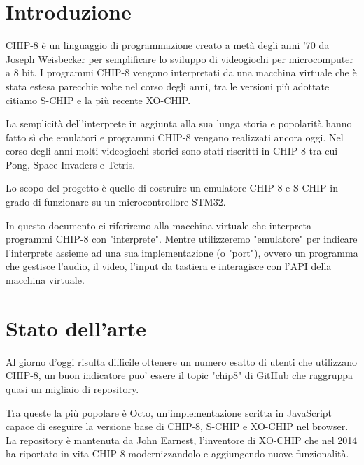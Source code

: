 \documentclass[a4paper]{article}
\begin{document}
\setlength{\parindent}{0pt}
\setlength{\parskip}{0.8em}

\tableofcontents
\listoffigures
\listoftables

\newpage

\section{Introduzione}


CHIP-8 è un linguaggio di programmazione creato a metà degli anni '70
da Joseph Weisbecker per semplificare lo sviluppo di videogiochi per
microcomputer a 8 bit. I programmi CHIP-8 vengono interpretati da una
macchina virtuale che è stata estesa parecchie volte nel corso degli
anni, tra le versioni più adottate citiamo S-CHIP e la più recente
XO-CHIP.

La semplicità dell'interprete in aggiunta alla sua lunga storia e
popolarità hanno fatto sì che emulatori e programmi CHIP-8 vengano
realizzati ancora oggi.
Nel corso degli anni molti videogiochi storici sono stati riscritti
in CHIP-8 tra cui Pong, Space Invaders e Tetris.

Lo scopo del progetto è quello di costruire un emulatore CHIP-8 e
S-CHIP in grado di funzionare su un microcontrollore STM32.

In questo documento ci riferiremo alla macchina virtuale che
interpreta programmi CHIP-8 con "interprete". Mentre utilizzeremo
"emulatore" per indicare l'interprete assieme ad una sua
implementazione (o "port"), ovvero un programma che gestisce
l'audio, il video, l'input da tastiera e interagisce con l'API della
macchina virtuale.

\section{Stato dell'arte}

Al giorno d'oggi risulta difficile ottenere un numero esatto di utenti che utilizzano CHIP-8, un buon indicatore puo' essere il topic "chip8" di GitHub che raggruppa quasi un migliaio di repository.

Tra queste la più popolare è Octo, un'implementazione scritta in JavaScript capace di eseguire la versione base di CHIP-8, S-CHIP e XO-CHIP nel browser. La repository è mantenuta da John Earnest, l'inventore di XO-CHIP che nel 2014 ha riportato in vita CHIP-8 modernizzandolo e aggiungendo nuove funzionalità.
\end{document}
